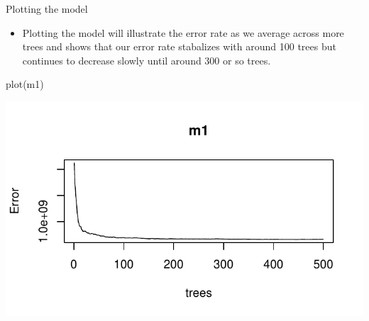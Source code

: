 \documentclass[
  10pt,
  ignorenonframetext,
]{beamer}
\newenvironment{Shaded}{}{}
\newcommand{\KeywordTok}[1]{\textcolor[rgb]{0.00,0.00,1.00}{#1}}
\newcommand{\NormalTok}[1]{#1}
\providecommand{\tightlist}{%
  \setlength{\itemsep}{0pt}\setlength{\parskip}{0pt}}
\begin{document}
\begin{frame}[fragile]{Plotting the model}
\protect\hypertarget{plotting-the-model}{}

\begin{itemize}
\tightlist
\item
  Plotting the model will illustrate the error rate as we average across
  more trees and shows that our error rate stabalizes with around 100
  trees but continues to decrease slowly until around 300 or so trees.
\end{itemize}

\begin{Shaded}
\begin{Highlighting}[]
\KeywordTok{plot}\NormalTok{(m1)}
\end{Highlighting}
\end{Shaded}

\includegraphics{c2_random_forests_files/figure-beamer/unnamed-chunk-5-1.pdf}

\end{frame}
\end{document}
